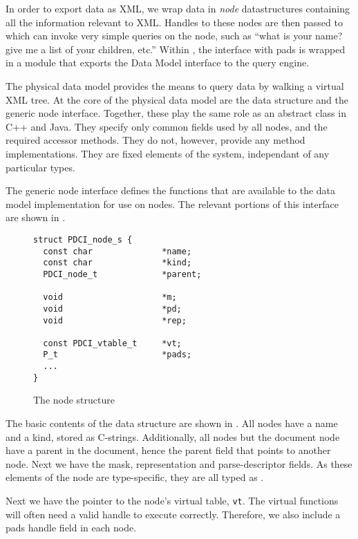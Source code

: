 {%

In order to export \pads{} data as XML, we wrap data in {\em node}
datastructures containing all the information relevant to XML. Handles
to these nodes are then passed to \galax which can invoke very simple
queries on the node, such as ``what is your name? give me a list of
your children, etc.''  Within \galax, the interface with pads is
wrapped in a module that exports the \galax Data Model interface to
the \galax query engine.

The physical data model provides the means to query \pads{} data by
walking a virtual XML tree.  At the core of the physical data model
are the  data structure and the generic node interface.
Together, these play the same role as an abstract class in C++ and
Java. They specify only common fields used by all nodes, and the
required accessor methods. They do not, however, provide any method
implementations. They are fixed elements of the system, independant of
any particular \pads{} types.

The generic node interface defines the functions that are available to the
\pads{} data model implementation for use on nodes. The relevant portions of
this interface are shown in .

\begin{figure}
{\small
\begin{verbatim}
struct PDCI_node_s {
  const char              *name;
  const char              *kind;
  PDCI_node_t             *parent;

  void                    *m;
  void                    *pd;
  void                    *rep;

  const PDCI_vtable_t     *vt;
  P_t                     *pads;
  ...
}
\end{verbatim}
}
\caption{The node structure}
\label{fig:node-struct}
\end{figure}

The basic contents of the  data structure are shown in
. All nodes have a name and a kind, stored as
C-strings. Additionally, all nodes but the document node have a parent
in the document, hence the parent field that points to another node.
Next we have the mask, representation and parse-descriptor fields. As
these elements of the node are type-specific, they are all typed as
\vptr.

Next we have the pointer to the node's virtual table, {\tt vt}. The
virtual functions will often need a valid \pads{} handle to execute
correctly. Therefore, we also include a pads handle field in each
node.

}
